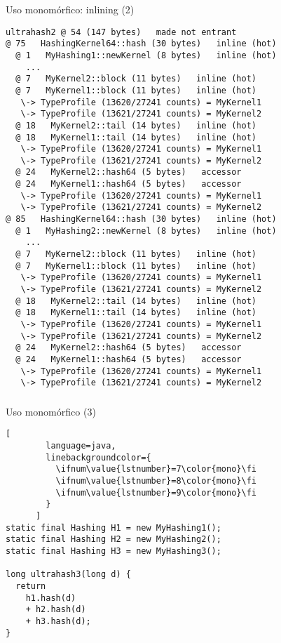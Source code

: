 \begin{frame}[fragile]
  \begin{block}{Uso monomórfico: inlining (2)}
    \begin{lstlisting}[basicstyle=\tiny]
ultrahash2 @ 54 (147 bytes)   made not entrant
@ 75   HashingKernel64::hash (30 bytes)   inline (hot)
  @ 1   MyHashing1::newKernel (8 bytes)   inline (hot)
    ...
  @ 7   MyKernel2::block (11 bytes)   inline (hot)
  @ 7   MyKernel1::block (11 bytes)   inline (hot)
   \-> TypeProfile (13620/27241 counts) = MyKernel1
   \-> TypeProfile (13621/27241 counts) = MyKernel2
  @ 18   MyKernel2::tail (14 bytes)   inline (hot)
  @ 18   MyKernel1::tail (14 bytes)   inline (hot)
   \-> TypeProfile (13620/27241 counts) = MyKernel1
   \-> TypeProfile (13621/27241 counts) = MyKernel2
  @ 24   MyKernel2::hash64 (5 bytes)   accessor
  @ 24   MyKernel1::hash64 (5 bytes)   accessor
   \-> TypeProfile (13620/27241 counts) = MyKernel1
   \-> TypeProfile (13621/27241 counts) = MyKernel2
@ 85   HashingKernel64::hash (30 bytes)   inline (hot)
  @ 1   MyHashing2::newKernel (8 bytes)   inline (hot)
    ...
  @ 7   MyKernel2::block (11 bytes)   inline (hot)
  @ 7   MyKernel1::block (11 bytes)   inline (hot)
   \-> TypeProfile (13620/27241 counts) = MyKernel1
   \-> TypeProfile (13621/27241 counts) = MyKernel2
  @ 18   MyKernel2::tail (14 bytes)   inline (hot)
  @ 18   MyKernel1::tail (14 bytes)   inline (hot)
   \-> TypeProfile (13620/27241 counts) = MyKernel1
   \-> TypeProfile (13621/27241 counts) = MyKernel2
  @ 24   MyKernel2::hash64 (5 bytes)   accessor
  @ 24   MyKernel1::hash64 (5 bytes)   accessor
   \-> TypeProfile (13620/27241 counts) = MyKernel1
   \-> TypeProfile (13621/27241 counts) = MyKernel2
    \end{lstlisting}
  \end{block}
\end{frame}


\begin{frame}[fragile]
  \frametitle{\ft}
  \begin{block}{Uso monomórfico (3)}
    \begin{lstlisting}[
        language=java,
        linebackgroundcolor={
          \ifnum\value{lstnumber}=7\color{mono}\fi
          \ifnum\value{lstnumber}=8\color{mono}\fi
          \ifnum\value{lstnumber}=9\color{mono}\fi
        }
      ]
static final Hashing H1 = new MyHashing1();
static final Hashing H2 = new MyHashing2();
static final Hashing H3 = new MyHashing3();

long ultrahash3(long d) {
  return
    h1.hash(d)
    + h2.hash(d)
    + h3.hash(d);
}
    \end{lstlisting}
  \end{block}
\end{frame}



